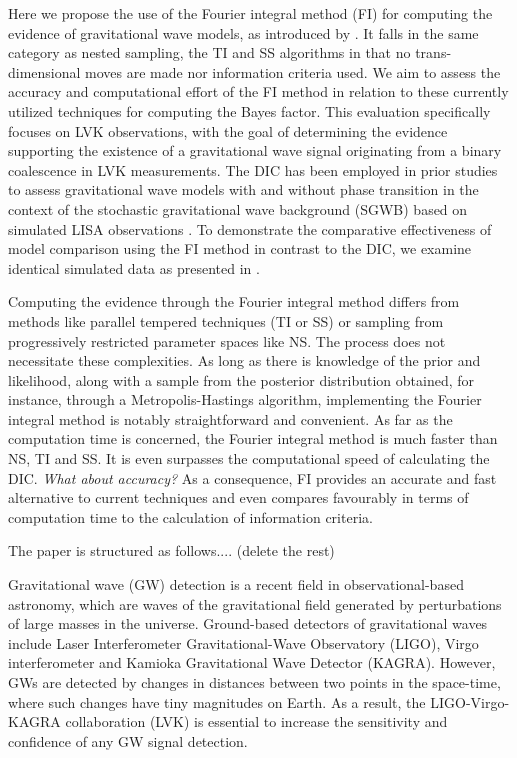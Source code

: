 \documentclass[%
 reprint,
 amsmath,amssymb,
 aps,
]{revtex4-2}
\begin{document}
Here we propose the use of the Fourier integral method (FI) for computing the evidence of  gravitational wave models, as introduced by \cite{rotiroti2022computing}. It falls in the same category as nested sampling, the TI and SS algorithms in that no trans-dimensional moves are made nor information criteria used.  
We aim to assess the accuracy and computational effort of the FI method in relation to these currently utilized techniques for computing the Bayes factor. This evaluation specifically focuses on LVK observations, with the goal of determining the evidence supporting the existence of a gravitational wave signal originating from a binary coalescence in LVK measurements. 
The DIC has been employed in prior studies to assess gravitational wave models with and without phase transition in the context of the stochastic gravitational wave background (SGWB) based on simulated LISA observations \cite{BoileauGuillaume2023PfLt}. To demonstrate the comparative effectiveness of model comparison using the FI method in contrast to the DIC, we examine identical simulated data as presented in \cite{BoileauGuillaume2023PfLt}.

Computing the evidence through the Fourier integral method differs from methods like parallel tempered techniques (TI or SS) or sampling from progressively restricted parameter spaces like NS. The process does not necessitate these complexities. As long as there is knowledge of the prior and likelihood, along with a sample from the posterior distribution obtained, for instance, through a Metropolis-Hastings algorithm, implementing the Fourier integral method is notably straightforward and convenient. As far as the computation time is concerned,  the Fourier integral method is much faster than NS, TI and SS.  It is even  surpasses the computational speed of calculating the DIC. {\em What about accuracy?} As a consequence,
FI provides an accurate and fast alternative to current techniques and even compares favourably in terms of computation time to the calculation of information criteria.

The paper is structured as follows.... (delete the rest)

\bigskip

Gravitational wave (GW) detection is a recent field in observational-based astronomy, which are waves of the gravitational field generated by perturbations of large masses in the universe. Ground-based detectors of gravitational waves include Laser Interferometer Gravitational-Wave Observatory (LIGO), Virgo interferometer and Kamioka Gravitational Wave Detector (KAGRA). However, GWs are detected by changes in distances between two points in the space-time, where such changes have tiny magnitudes on Earth. As a result, the LIGO-Virgo-KAGRA collaboration (LVK) is essential to increase the sensitivity and confidence of any GW signal detection. 
\end{document}
